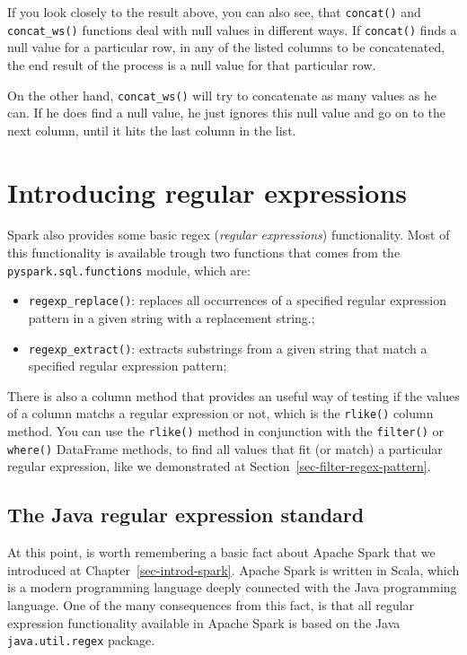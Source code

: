 \documentclass[
  11pt,
  letterpaper,
  DIV=11,
  numbers=noendperiod]{scrreprt}
\providecommand{\tightlist}{%
  \setlength{\itemsep}{0pt}\setlength{\parskip}{0pt}}\usepackage{longtable,booktabs,array}
\begin{document}
If you look closely to the result above, you can also see, that
\texttt{concat()} and \texttt{concat\_ws()} functions deal with null
values in different ways. If \texttt{concat()} finds a null value for a
particular row, in any of the listed columns to be concatenated, the end
result of the process is a null value for that particular row.

On the other hand, \texttt{concat\_ws()} will try to concatenate as many
values as he can. If he does find a null value, he just ignores this
null value and go on to the next column, until it hits the last column
in the list.

\hypertarget{sec-regex}{%
\section{Introducing regular expressions}\label{sec-regex}}

Spark also provides some basic regex (\emph{regular expressions})
functionality. Most of this functionality is available trough two
functions that comes from the \texttt{pyspark.sql.functions} module,
which are:

\begin{itemize}
\tightlist
\item
  \texttt{regexp\_replace()}: replaces all occurrences of a specified
  regular expression pattern in a given string with a replacement
  string.;
\item
  \texttt{regexp\_extract()}: extracts substrings from a given string
  that match a specified regular expression pattern;
\end{itemize}

There is also a column method that provides an useful way of testing if
the values of a column matchs a regular expression or not, which is the
\texttt{rlike()} column method. You can use the \texttt{rlike()} method
in conjunction with the \texttt{filter()} or \texttt{where()} DataFrame
methods, to find all values that fit (or match) a particular regular
expression, like we demonstrated at
Section~\ref{sec-filter-regex-pattern}.

\hypertarget{the-java-regular-expression-standard}{%
\subsection{The Java regular expression
standard}\label{the-java-regular-expression-standard}}

At this point, is worth remembering a basic fact about Apache Spark that
we introduced at Chapter~\ref{sec-introd-spark}. Apache Spark is written
in Scala, which is a modern programming language deeply connected with
the Java programming language. One of the many consequences from this
fact, is that all regular expression functionality available in Apache
Spark is based on the Java \texttt{java.util.regex} package.
\end{document}

